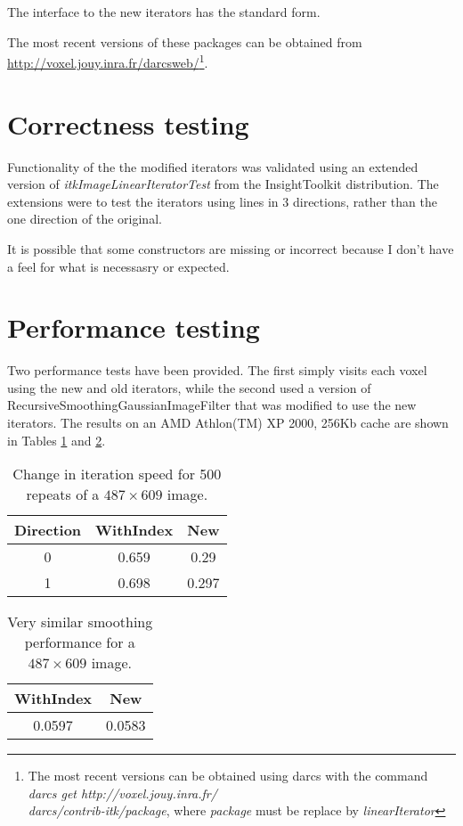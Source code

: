\documentclass{InsightArticle}
\begin{document}
The interface to the new iterators has the standard form.

The most recent versions of these packages can be
obtained from \url{http://voxel.jouy.inra.fr/darcsweb/}\footnote{
The most recent versions can be obtained using darcs \cite{DarcsWebSite}
with the command {\em darcs get http://voxel.jouy.inra.fr/\\darcs/contrib-itk/package},
where {\em package} must be replace by {\em linearIterator}}.

\section{Correctness testing}
Functionality of the the modified iterators was validated using an
extended version of {\em itkImageLinearIteratorTest} from the
InsightToolkit distribution. The extensions were to test the iterators
using lines in 3 directions, rather than the one direction of the
original.

It is possible that some constructors are missing or incorrect because
I don't have a feel for what is necessasry or expected.

\section{Performance testing}
Two performance tests have been provided. The first simply visits each
voxel using the new and old iterators, while the second used a version
of RecursiveSmoothingGaussianImageFilter that was modified to use the
new iterators. The results on an AMD Athlon(TM) XP 2000, 256Kb cache are shown in Tables \ref{tab:iterationPerf} and \ref{tab:smoothingPerf}.

\begin{table}[htbp]
\centering
\begin{tabular}{ccc}
\hline
Direction  &  WithIndex &  New \\
\hline
0   &    0.659  & 0.29 \\
1   &    0.698  & 0.297 \\
\hline
\end{tabular}
\caption{Change in iteration speed for 500 repeats of a $487 \times 609$ image. \label{tab:iterationPerf}}
\end{table}

\begin{table}[htbp]
\centering
\begin{tabular}{cc}
\hline
WithIndex &  New \\
\hline
0.0597 & 0.0583 \\
\hline
\end{tabular}
\caption{Very similar smoothing performance for a $487 \times 609$ image. \label{tab:smoothingPerf}}
\end{table}
\end{document}
